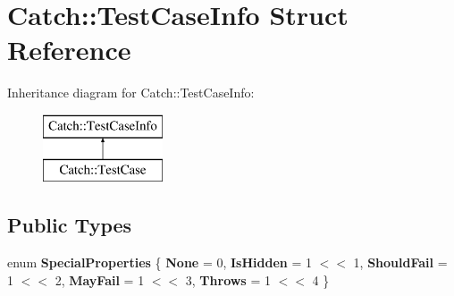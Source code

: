 \hypertarget{struct_catch_1_1_test_case_info}{}\section{Catch\+:\+:Test\+Case\+Info Struct Reference}
\label{struct_catch_1_1_test_case_info}
Inheritance diagram for Catch\+:\+:Test\+Case\+Info\+:\begin{figure}[H]
\begin{center}
\leavevmode
\includegraphics[height=2.000000cm]{struct_catch_1_1_test_case_info}
\end{center}
\end{figure}
\subsection*{Public Types}
\begin{DoxyCompactItemize}
\item 
\mbox{\label{struct_catch_1_1_test_case_info_a39b232f74b4a7a6f2183b96759027eac}} 
enum {\bfseries Special\+Properties} \{ \newline
{\bfseries None} = 0, 
{\bfseries Is\+Hidden} = 1 $<$$<$ 1, 
{\bfseries Should\+Fail} = 1 $<$$<$ 2, 
{\bfseries May\+Fail} = 1 $<$$<$ 3, 
\newline
{\bfseries Throws} = 1 $<$$<$ 4
 \}
\end{DoxyCompactItemize}
